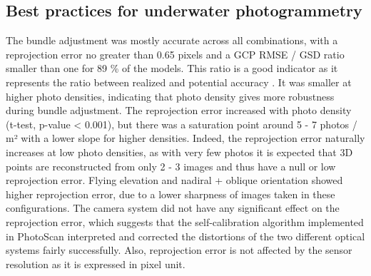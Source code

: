 \subsection{Best practices for underwater photogrammetry}\label{chapitre1_4.1}
The bundle adjustment was mostly accurate across all combinations, with a reprojection error no greater than 0.65 pixels and a GCP RMSE / GSD ratio smaller than one for 89 \% of the models. This ratio is a good indicator as it represents the ratio between realized and potential accuracy \citep{forstner_photogrammetric_2016}. It was smaller at higher photo densities, indicating that photo density gives more robustness during bundle adjustment. The reprojection error increased with photo density (t-test, p-value < 0.001), but there was a saturation point around 5 - 7 photos / m² with a lower slope for higher densities. Indeed, the reprojection error naturally increases at low photo densities, as with very few photos it is expected that 3D points are reconstructed from only 2 - 3 images and thus have a null or low reprojection error. Flying elevation and nadiral + oblique orientation showed higher reprojection error, due to a lower sharpness of images taken in these configurations. The camera system did not have any significant effect on the reprojection error, which suggests that the self-calibration algorithm implemented in PhotoScan interpreted and corrected the distortions of the two different optical systems fairly successfully. Also, reprojection error is not affected by the sensor resolution as it is expressed in pixel unit.
\medskip
